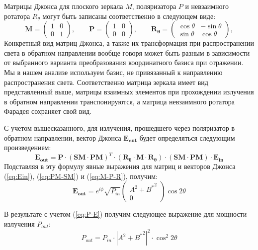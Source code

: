\documentclass{article}
\begin{document}
Матрицы Джонса для плоского зеркала $M$, поляризатора  $P$ и невзаимного ротатора $R_\theta$ могут быть записаны соответственно в следующем виде:
\begin{equation}
	\label{eq:M-P-R}
	\bm{M} = 
	\begin{pmatrix}
		1 & 0 \\
		0 & 1
	\end{pmatrix},\qquad 		
	\bm{P} = 
	\begin{pmatrix}
		1 & 0 \\
		0 & 0
	\end{pmatrix},\qquad 
	\bm{R_\theta} = 
	\begin{pmatrix}
		\cos\theta & -\sin\theta \\
		\sin\theta & \cos\theta
	\end{pmatrix},		
\end{equation}
Конкретный вид матриц Джонса, а также их трансформация при распространении света в обратном направлении вообще говоря может быть разным в зависимости от выбранного варианта преобразования координатного базиса при отражении.
Мы в нашем анализе используем базис, не привязанный к направлению распространения света.
Соответственно матрица зеркала имеет вид представленный выше, матрицы взаимных элементов при прохождении излучения в обратном направлении транспонируются, а матрица невзаимного ротатора Фарадея сохраняет свой вид.

С учетом вышесказанного, для излучения, прошедшего через поляризатор в обратном направлении, вектор Джонса $\bm{E_{out}}$ будет определяться следующим произведением:
\begin{equation}
    \label{eq:E_out}
    \bm{E_{out}} = \bm{P} \cdot (\bm{SM}\cdot \bm{PM})^T\cdot (\bm{R_\theta} \cdot \bm{M} \cdot \bm{R_\theta})\cdot (\bm{SM}\cdot \bm{PM})\cdot \bm{E_{in}}
\end{equation}	
Подставляя в эту формулу явные выражения для матриц и векторов Джонса (\ref{eq:Ein}), (\ref{eq:PM-SM}) и (\ref{eq:M-P-R}), получим:
\begin{equation}
	\bm{E_{out}} =  e^{i\phi} \sqrt{P_{in}} \begin{pmatrix} A^2 + {B^*}^2 \\ 0 \end{pmatrix}\cos 2 \theta
\end{equation}

В результате с учетом (\ref{eq:P-E}) получим следующее выражение для мощности излучения $P_{out}$:
\begin{equation}
	P_{out} = P_{in} \cdot \left| A^2 + {B^*}^2 \right|^2 \cdot \cos^2 2 \theta
\end{equation}
\end{document}
